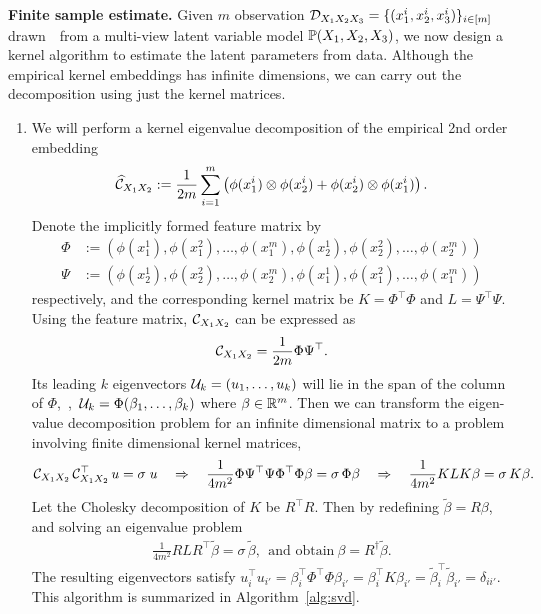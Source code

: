 \documentclass{article}
\begin{document}
{\bf Finite sample estimate.} Given $m$ observation $\mathcal{D}_{X_1 X_2 X_3}=\{(x_1^i,x_2^i,x_3^i)\}_{i \in [m]}$ drawn~\iid~from a multi-view latent variable model $\mathbb{P}(X_1,X_2,X_3)$, we now design a kernel algorithm to estimate the latent parameters from data. Although the empirical kernel embeddings has infinite dimensions, we can carry out the decomposition using just the kernel matrices.

\begin{enumerate}

\item We will perform a kernel eigenvalue decomposition of the empirical 2nd order embedding
$$
  \widehat {\mathcal{C}}_{X_1 X_2}:= \frac{1}{2m} \sum_{i=1}^{m} \left(\phi(x_1^i) \otimes \phi(x_2^i) + \phi(x_2^i) \otimes \phi(x_1^i)\right).
$$
Denote the implicitly formed feature matrix by
\begin{align}
  \Phi &:= (\phi(x_1^1),  \phi(x_1^2), \ldots, \phi(x_1^m), \phi(x_2^1),  \phi(x_2^2), \ldots, \phi(x_2^m))  \\
  \Psi &:= (\phi(x_2^1), \phi(x_2^2), \ldots, \phi(x_2^m), \phi(x_1^1),  \phi(x_1^2), \ldots, \phi(x_1^m))
\end{align}
respectively, and the corresponding kernel matrix be $K = \Phi^\top \Phi$ and $L = \Psi^\top \Psi$. Using the feature matrix, $\mathcal{C}_{X_1 X_2}$ can be expressed as
$$
	\mathcal{C}_{X_1 X_2} = \frac{1}{2m} \Phi \Psi^\top.
$$
Its leading $k$ eigenvectors $\mathcal{U}_k = (u_1,\ldots,u_k)$ will lie in the span of the column of  $\Phi$,~\ie,~$\mathcal{U}_k = \Phi (\beta_1,\ldots,\beta_k)$ where $\beta \in \mathbb{R}^m$. Then we can transform the eigen-value decomposition problem for an infinite dimensional matrix to a problem involving finite dimensional kernel matrices,
$$
	\mathcal{C}_{X_1 X_2}\, \mathcal{C}_{X_1 X_2}^\top\, u = \sigma \;u
	\quad \Rightarrow \quad
	\frac{1}{4m^2}\Phi \Psi^\top \Psi \Phi^\top \Phi \beta = \sigma\,\Phi \beta
	\quad \Rightarrow \quad
	\frac{1}{4m^2} K L K \beta = \sigma \,K \beta.
$$
Let the Cholesky decomposition of $K$ be $R^\top R$. Then by redefining $\widetilde{\beta}=R\beta$, and solving an eigenvalue problem
\begin{align}
 \frac{1}{4m^2} R L R^\top \widetilde{\beta} = \sigma \, \widetilde{\beta},~~\text{and obtain}~\beta = R^{\dagger} \widetilde{\beta}.
\end{align}
The resulting eigenvectors satisfy $u_i^\top u_{i'} = \beta_i^\top \Phi^\top \Phi \beta_{i'} =  \beta_{i}^\top K  \beta_{i'} =  \widetilde{\beta}_{i}^\top \widetilde{\beta}_{i'}=\delta_{ii'}$.
This algorithm is summarized in Algorithm~\ref{alg:svd}.


\end{enumerate}
\end{document}
